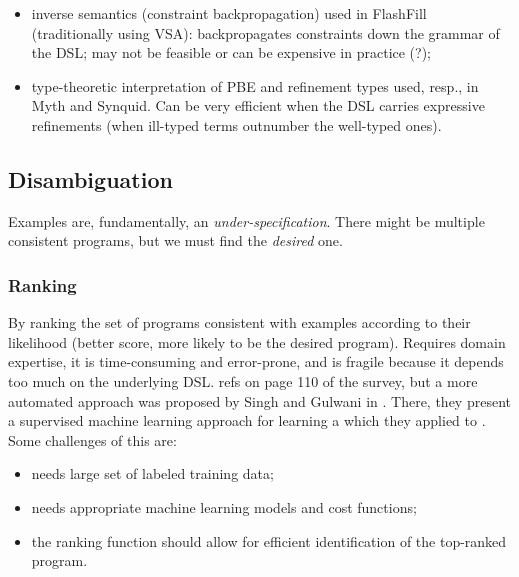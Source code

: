 

\begin{itemize}
\item inverse semantics (constraint backpropagation) used in FlashFill
(traditionally using \ac{VSA}): backpropagates constraints down the grammar of
the \ac{DSL}; may not be feasible or can be expensive in practice (?);
\item type-theoretic interpretation of \ac{PBE} and refinement types used, resp.,
in Myth and Synquid. Can be very efficient when the \ac{DSL} carries expressive
refinements (when ill-typed terms outnumber the well-typed ones).
\end{itemize}

\subsection{Disambiguation}
\label{sec:resolving-ambiguity}

Examples are, fundamentally, an \textit{under-specification}. There might be
multiple consistent programs, but we must find the \textit{desired} one.

\subsubsection{Ranking}

 By ranking the set of programs
consistent with examples according to their likelihood (better score, more
likely to be the desired program). Requires domain expertise, it is
time-consuming and error-prone, and is fragile because it depends too much on
the underlying \ac{DSL}.  {refs on page 110 of the survey},
but a more automated approach was proposed by Singh and Gulwani in
\cite{Singh:ranking:2015}. There, they present a supervised machine learning
approach for learning a  which
they applied to . Some challenges of this are:
\begin{itemize}
\item needs large set of labeled training data;
\item needs appropriate machine learning models and cost functions;
\item the ranking function should allow for efficient identification of the
  top-ranked program.
\end{itemize}


